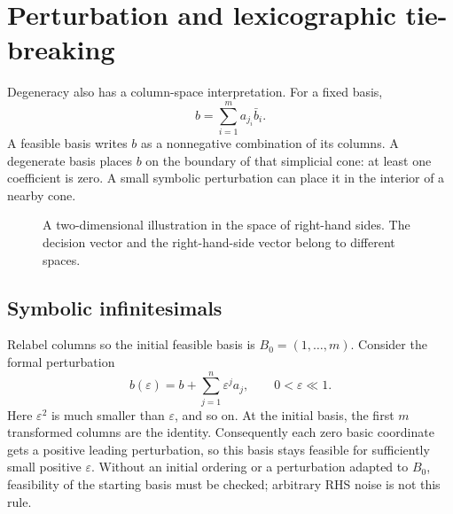 \documentclass[11pt,a4paper]{article}
\begin{document}
\section{Perturbation and lexicographic tie-breaking}\label{sec:perturbation}
Degeneracy also has a column-space interpretation. For a fixed basis,
\[
  b=\sum_{i=1}^m a_{j_i}\bar b_i.
\]
A feasible basis writes $b$ as a nonnegative combination of its columns.
A degenerate basis places $b$ on the boundary of that simplicial cone: at least
one coefficient is zero. A small symbolic perturbation can place it in the
interior of a nearby cone.
\begin{figure}[H]
  \centering
  \caption{A two-dimensional illustration in the space of right-hand sides.
    The decision vector and the right-hand-side vector belong to different spaces.}
\end{figure}

\subsection{Symbolic infinitesimals}\label{sec:lex}
Relabel columns so the initial feasible basis is $B_0=(1,\ldots,m)$.
Consider the formal perturbation
\begin{equation}\label{eq:perturb}
  b(\varepsilon)=b+\sum_{j=1}^n\varepsilon^j a_j,
  \qquad 0<\varepsilon\ll1.
\end{equation}
Here $\varepsilon^2$ is much smaller than $\varepsilon$, and so on.
At the initial basis, the first $m$ transformed columns are the identity.
Consequently each zero basic coordinate gets a positive leading perturbation,
so this basis stays feasible for sufficiently small positive $\varepsilon$.
Without an initial ordering or a perturbation adapted to $B_0$, feasibility
of the starting basis must be checked; arbitrary RHS noise is not this rule.
\end{document}

